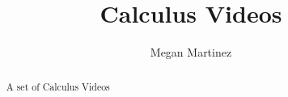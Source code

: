\documentclass{xourse}
\title{Calculus Videos}
\author{Megan Martinez}
\begin{document}
\begin{abstract} A set of Calculus Videos \end{abstract}

\maketitle








\end{document}
